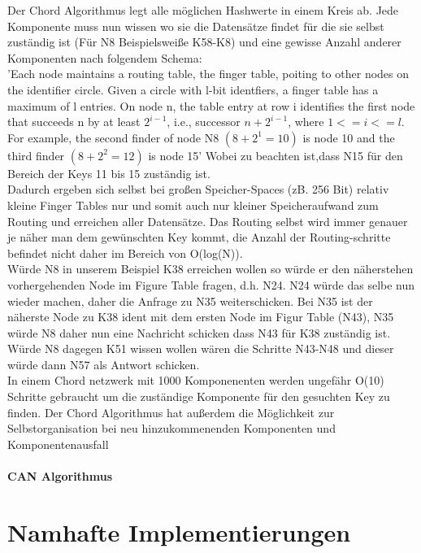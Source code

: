 \documentclass[a4paper,12pt]{scrreprt}
\begin{document}
					Der Chord Algorithmus legt alle möglichen Hashwerte in einem Kreis ab. Jede Komponente muss nun wissen wo sie die Datensätze findet für die sie selbst zuständig ist (Für N8 Beispielsweiße K58-K8) und eine gewisse Anzahl anderer Komponenten nach folgendem Schema:\\
					'Each node maintains a routing table, the finger table, poiting to other nodes on the identifier circle. Given a circle with l-bit identfiers, a finger table has a maximum of l entries. On node n, the table entry at row i identifies the first node that succeeds n by at least $2^{i-1}$, i.e., successor $n+{2}^{i-1}$, where $1 <= i <= l$. For example, the second finder of node N8 $(8+2^1=10)$ is node 10 and the third finder $(8+2^2=12)$ is node 15' Wobei zu beachten ist,dass N15 für den Bereich der Keys 11 bis 15 zuständig ist. %
					\\Dadurch ergeben sich selbst bei großen Speicher-Spaces (zB. 256 Bit) relativ kleine Finger Tables nur und somit auch nur kleiner Speicheraufwand zum Routing und erreichen aller Datensätze. Das Routing selbst wird immer genauer je näher man dem gewünschten Key kommt, die Anzahl der Routing-schritte befindet nicht daher im Bereich von O(log(N)). \\
					Würde N8 in unserem Beispiel \label{fig:Chord} K38 erreichen wollen so würde er den näherstehen vorhergehenden Node im Figure Table fragen, d.h. N24. N24 würde das selbe nun wieder machen, daher die Anfrage zu N35 weiterschicken. Bei N35 ist der näherste Node zu K38 ident mit dem ersten Node im Figur Table (N43), N35 würde N8 daher nun eine Nachricht schicken dass N43 für K38 zuständig ist. Würde N8 dagegen K51 wissen wollen wären die Schritte N43-N48 und dieser würde dann N57 als Antwort schicken.\\
					In einem Chord netzwerk mit 1000 Komponenenten werden ungefähr O(10) Schritte gebraucht um die zuständige Komponente für den gesuchten Key zu finden. Der Chord Algorithmus hat außerdem die Möglichkeit zur Selbstorganisation bei neu hinzukommenenden Komponenten und Komponentenausfall
					
					
				\subsubsection{CAN Algorithmus}
	
\chapter{Namhafte Implementierungen}
\end{document}
